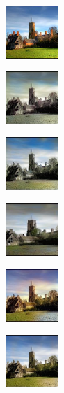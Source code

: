 \begin{figure}[t]
	\centering
	\captionsetup[subfigure]{labelformat=empty}
	\begin{subfigure}[b]{0.1\textwidth}
		\centering
		\includegraphics[width=2cm]{or - imgnet.jpeg}
	\end{subfigure}
	\hfill
	\begin{subfigure}[b]{0.1\textwidth}
		\includegraphics[width=2cm]{b - imgnet.jpeg}
	\end{subfigure}
	\hfill
	\begin{subfigure}[b]{0.1\textwidth}
		\includegraphics[width=2cm]{bw - imgnet.jpeg}
	\end{subfigure}
	\hfill
	\begin{subfigure}[b]{0.1\textwidth}
		\includegraphics[width=2cm]{d - imgnet.jpeg}
	\end{subfigure}
	\hfill
	\begin{subfigure}[b]{0.1\textwidth}
		\includegraphics[width=2cm]{z - imgnet2.jpeg}
	\end{subfigure}
	\hfill
	\begin{subfigure}[b]{0.1\textwidth}
		\includegraphics[width=2cm]{si - imgnet2.jpeg}

\end{subfigure}
\end{figure}
